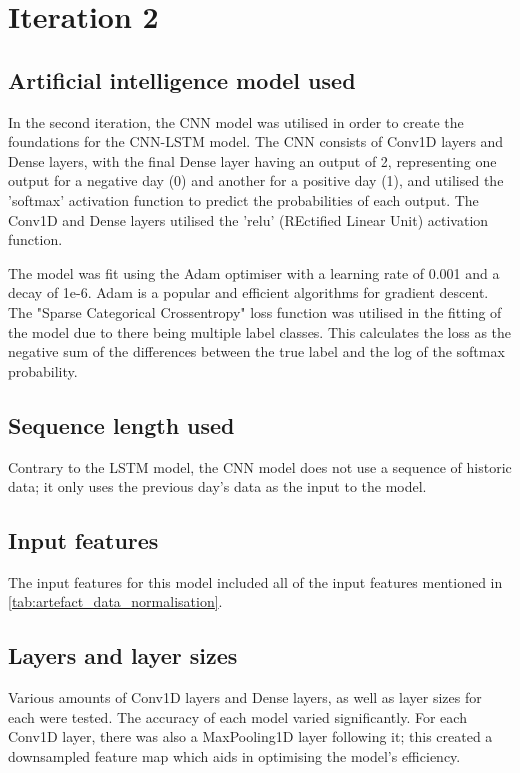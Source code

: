 \section{Iteration 2}
\subsection{Artificial intelligence model used}\label{ssec:iteration2_ai_model}
In the second iteration, the CNN model was utilised in order to create the foundations for the CNN-LSTM model. The CNN
consists of Conv1D layers and Dense layers, with the final Dense layer having an output of 2, representing one output for
a negative day (0) and another for a positive day (1), and utilised the 'softmax' activation function to predict the
probabilities of each output. The Conv1D and Dense layers utilised the 'relu' (REctified Linear Unit) activation
function.

The model was fit using the Adam optimiser with a learning rate of 0.001 and a decay of 1e-6. Adam is a popular
and efficient algorithms for gradient descent.
The "Sparse Categorical Crossentropy" loss function was utilised in the fitting of the model due to there being multiple
label classes. This calculates the loss as the negative sum of the differences between the true label and the log of the softmax
probability.

\subsection{Sequence length used}
Contrary to the LSTM model, the CNN model does not use a sequence of historic data; it only uses the previous day's
data as the input to the model.

\subsection{Input features}
The input features for this model included all of the input features mentioned in \autoref{tab:artefact_data_normalisation}.

\subsection{Layers and layer sizes} \label{ssec:iteration2layers}
Various amounts of Conv1D layers and Dense layers, as well as layer sizes for each were tested. The accuracy of each model varied
significantly. For each Conv1D layer, there was also a MaxPooling1D layer following it; this created a downsampled
feature map which aids in optimising the model's efficiency.

